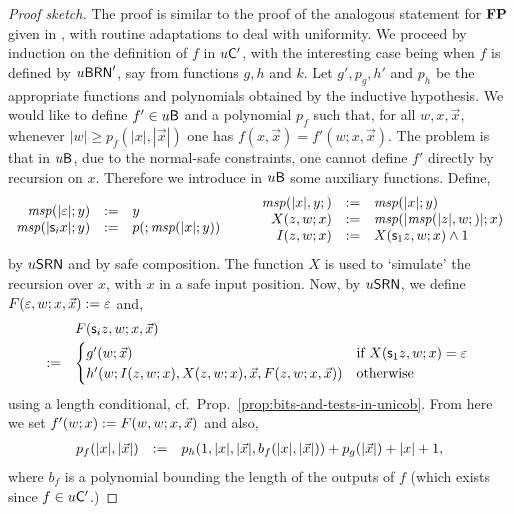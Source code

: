 \documentclass{lmcs}
\begin{document}
\begin{proof}
	[Proof sketch]
	The proof is similar to the proof of the analogous statement for $\mathbf{FP}$ given in \cite{BelCoo92}, with routine adaptations to deal with uniformity. We proceed by induction on the definition of $f$ in $u \mathsf{C}'$, with the interesting case being when $f$ is defined by $u\mathsf{BRN}'$, say from functions $g,h$ and $k$. Let $g', p_g, h'$ and $p_h$ be the appropriate functions and polynomials obtained by the inductive hypothesis. We would like to define $f'\in u \mathsf{B}$ and a polynomial $p_f$ such that, for all $w,x,\vec x$, whenever $|w|\geq p_f(|x|,|\vec x|)$ one has $f(x,\vec x)=f'(w;x,\vec x)$. The problem is that in $u \mathsf{B}$, due to the normal-safe constraints, one cannot define $f'$ directly by recursion on $x$. Therefore we introduce in $u \mathsf{B}$ some auxiliary functions. Define,
	\[
	\begin{array}{rcl}
	\mathit{msp} (|\varepsilon | ; y ) & := & y \\
	\mathit{msp} (|\mathsf s_{i} x | ; y ) & := & p (;\mathit{msp} (|x|;y))
	\end{array}
	\qquad
	\begin{array}{rcl}
	\mathit{msp} (|x|,y; ) & := & \mathit{msp} (|x|;y) \\
	X(z,w ; x) & := & \mathit{msp} (|\mathit{msp} (|z|,w;)|;x) \\
	I(z,w ; x) &:= & X(\mathsf s_{1}  z,w;x)\wedge 1
	\end{array}
\]
by $u \mathsf{SRN}$ and by safe composition.
	The function $X$ is used to `simulate' the recursion over $x$, with $x$ in a safe input position. 
	Now, by $u \mathsf{SRN}$, we define $F(\varepsilon ,w ; x,\vec x)  := \varepsilon$ and,
	\begin{equation}
	\label{eqn:srn-mimics-brn}
	\begin{array}{rl}
	& F(\succ i z, w ; x,\vec x)  \\
	\noalign{\smallskip}
	\dfn & 
	\begin{cases}
	g'(w;\vec x) & \text{if $X(\succ 1 z,w;x) = \epsilon$ } \\
	h'(w;I(z,w;x),X(z,w;x),\vec x,F(z,w;x,\vec x)) & \text{otherwise}
	\end{cases}
	\end{array}
\end{equation}
	using a length conditional, cf.~Prop.~\ref{prop:bits-and-tests-in-unicob}.
	From here we set
	$
	f'(w ; x) 
	:= 
	F(w,w;x,\vec x)
	$
	and also,
	\[
	\begin{array}{rcl}
	p_f (|x|,|\vec x|) & := & p_h (1,|x|,|\vec x|,b_f(|x|,|\vec x|))+p_g (|\vec x|)+|x|+1,
	\end{array}
	\]
	where $b_f$ is a polynomial bounding the length of the outputs of $f$ (which exists since $f \in u \mathsf{C}'$.)
	

\end{proof}
\end{document}
